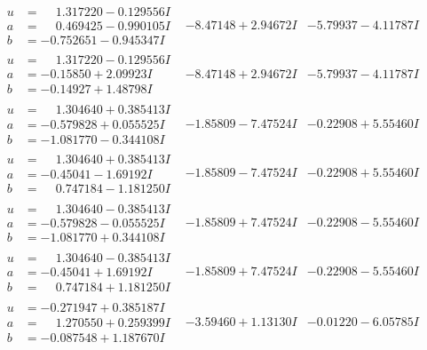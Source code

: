 \documentclass[1p]{elsarticle_modified}
\theoremstyle{definition}
\begin{document}
$$\begin{array}{c|c|c}
\begin{aligned}
u &= \phantom{-}1.317220 - 0.129556 I \\
a &= \phantom{-}0.469425 - 0.990105 I \\
b &= -0.752651 - 0.945347 I\end{aligned}
 & -8.47148 + 2.94672 I & -5.79937 - 4.11787 I \\ \hline\begin{aligned}
u &= \phantom{-}1.317220 - 0.129556 I \\
a &= -0.15850 + 2.09923 I \\
b &= -0.14927 + 1.48798 I\end{aligned}
 & -8.47148 + 2.94672 I & -5.79937 - 4.11787 I \\ \hline\begin{aligned}
u &= \phantom{-}1.304640 + 0.385413 I \\
a &= -0.579828 + 0.055525 I \\
b &= -1.081770 - 0.344108 I\end{aligned}
 & -1.85809 - 7.47524 I & -0.22908 + 5.55460 I \\ \hline\begin{aligned}
u &= \phantom{-}1.304640 + 0.385413 I \\
a &= -0.45041 - 1.69192 I \\
b &= \phantom{-}0.747184 - 1.181250 I\end{aligned}
 & -1.85809 - 7.47524 I & -0.22908 + 5.55460 I \\ \hline\begin{aligned}
u &= \phantom{-}1.304640 - 0.385413 I \\
a &= -0.579828 - 0.055525 I \\
b &= -1.081770 + 0.344108 I\end{aligned}
 & -1.85809 + 7.47524 I & -0.22908 - 5.55460 I \\ \hline\begin{aligned}
u &= \phantom{-}1.304640 - 0.385413 I \\
a &= -0.45041 + 1.69192 I \\
b &= \phantom{-}0.747184 + 1.181250 I\end{aligned}
 & -1.85809 + 7.47524 I & -0.22908 - 5.55460 I \\ \hline\begin{aligned}
u &= -0.271947 + 0.385187 I \\
a &= \phantom{-}1.270550 + 0.259399 I \\
b &= -0.087548 + 1.187670 I\end{aligned}
 & -3.59460 + 1.13130 I & -0.01220 - 6.05785 I \\ \hline\begin{aligned}

\end{aligned}
\end{array}$$
\end{document}
